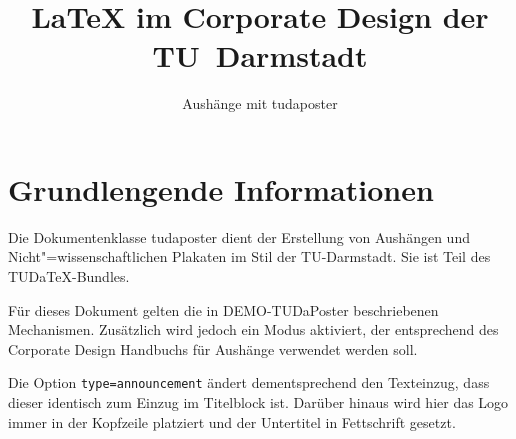 \documentclass[
	paper=a4,
	ngerman,
	accentcolor=9c,
	footer=true,
	type=announcement,
	fontsize=12pt
	]{tudaposter}
\let\code\texttt
\begin{document}
\title{\LaTeX{} im Corporate Design der TU~Darmstadt}
\subtitle{Aushänge mit tudaposter}



\maketitle

\section*{Grundlengende Informationen}
Die Dokumentenklasse tudaposter dient der Erstellung von Aushängen und Nicht"=wissenschaftlichen Plakaten im Stil der TU-Darmstadt. Sie ist Teil des TUDa\TeX-Bundles.

Für dieses Dokument gelten die in DEMO-TUDaPoster beschriebenen Mechanismen. Zusätzlich wird jedoch ein Modus aktiviert, der entsprechend des Corporate Design Handbuchs für Aushänge verwendet werden soll.

Die Option \code{type=announcement} ändert dementsprechend den Texteinzug, dass dieser identisch zum Einzug im Titelblock ist. Darüber hinaus wird hier das Logo immer in der Kopfzeile platziert und der Untertitel in Fettschrift gesetzt.
\end{document}
